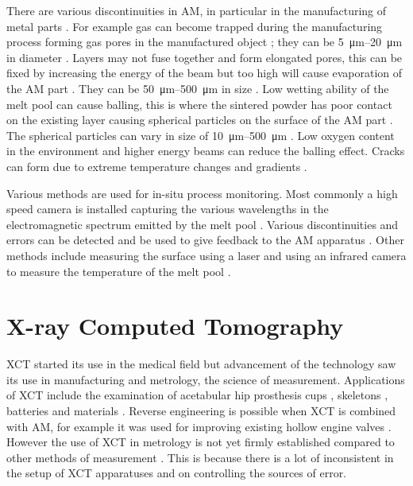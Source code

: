 There are various discontinuities in AM, in particular in the manufacturing of metal parts \citep{everton2016review}. For example gas can become trapped during the manufacturing process forming gas pores in the manufactured object \citep{thijs2010study, tammas2015xct}; they can be \SIrange{5}{20}{\micro\metre} in diameter \citep{everton2016review}. Layers may not fuse together and form elongated pores, this can be fixed by increasing the energy of the beam but too high will cause evaporation of the AM part \citep{mumtaz2008high}. They can be \SIrange{50}{500}{\micro\metre} in size \citep{everton2016review}. Low wetting ability of the melt pool can cause balling, this is where the sintered powder has poor contact on the existing layer causing spherical particles on the surface of the AM part \citep{li2012balling, gu2009balling}. The spherical particles can vary in size of \SIrange{10}{500}{\micro\metre} \citep{li2012balling}. Low oxygen content in the environment \citep{niu1999instability} and higher energy beams \citep{gu2009balling} can reduce the balling effect. Cracks can form due to extreme temperature changes and gradients \citep{mercelis2006residual, zaeh2010investigations}.

Various methods are used for in-situ process monitoring. Most commonly a high speed camera is installed capturing the various wavelengths in the electromagnetic spectrum emitted by the melt pool \citep{berumen2010quality, craeghs2011online, lott2011design}. Various discontinuities and errors can be detected \citep{clijsters2014in} and be used to give feedback to the AM apparatus \citep{herzog2013method}. Other methods include measuring the surface using a laser \citep{cerniglia2015inspection} and using an infrared camera to measure the temperature of the melt pool \citep{rodriguez2012integration}. 

\section{X-ray Computed Tomography}

XCT started its use in the medical field but advancement of the technology saw its use in manufacturing and metrology, the science of measurement. Applications of XCT include the examination of acetabular hip prosthesis cups \citep{kourra2018computed}, skeletons \citep{appleby2014scoliosis}, batteries \citep{taiwo2017investigating} and materials \citep{zhang2016x, wang2017x}. Reverse engineering is possible when XCT is combined with AM, for example it was used for improving existing hollow engine valves \citep{cooper2015design}. However the use of XCT in metrology is not yet firmly established compared to other methods of measurement \citep{thompson2016x}. This is because there is a lot of inconsistent in the setup of XCT apparatuses and on controlling the sources of error.

